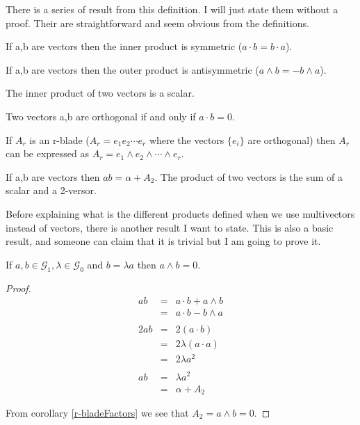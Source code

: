 There is a series of result from this definition. I will just state them without a proof. Their are straightforward and seem obvious from the definitions.

\begin{corollary}
If a,b are vectors then the inner product is symmetric ($a \cdot b = b \cdot a$).
\end{corollary}

\begin{corollary}
If a,b are vectors then the outer product is antisymmetric ($a \wedge b = - b \wedge a$).
\end{corollary}

\begin{corollary}
The inner product of two vectors is a scalar.
\end{corollary}

\begin{corollary}
Two vectors a,b are orthogonal if and only if $a \cdot b = 0$.
\end{corollary}

\begin{corollary}
\label{r-bladeFactors}
If $A_r$ is an r-blade ($A_r = e_1 e_2 \dotsm e_r$ where the vectors $\{e_i\}$ are orthogonal) then $A_r$ can be expressed as $A_r=e_1 \wedge e_2 \wedge \dotsm \wedge e_r$.
\end{corollary}

\begin{corollary}
If a,b are vectors then $ab = \alpha + A_2$. The product of two vectors is the sum of a scalar and a 2-versor.
\end{corollary}

Before explaining what is the different products defined when we use multivectors instead of vectors, there is another result I want to state. This is also a basic result, and someone can claim that it is trivial but I am going to prove it.

\begin {theorem}
If $a, b \in \mathcal{G}_1, \lambda \in \mathcal{G}_0$ and $b = \lambda a$ then $a \wedge b = 0$.
\end{theorem}

\begin{proof}
\begin{eqnarray*}
ab & = & a \cdot b + a \wedge b \\
& = & a \cdot b - b \wedge a \\
& & \\
2ab & = & 2 (a \cdot b) \\
& = & 2 \lambda (a \cdot a) \\
& = & 2 \lambda a^2 \\
& & \\
ab & = & \lambda a^2 \\
& = & \alpha + A_2
\end{eqnarray*}

From corollary \ref{r-bladeFactors} we see that $A_2 = a \wedge b = 0$.
\end{proof}

